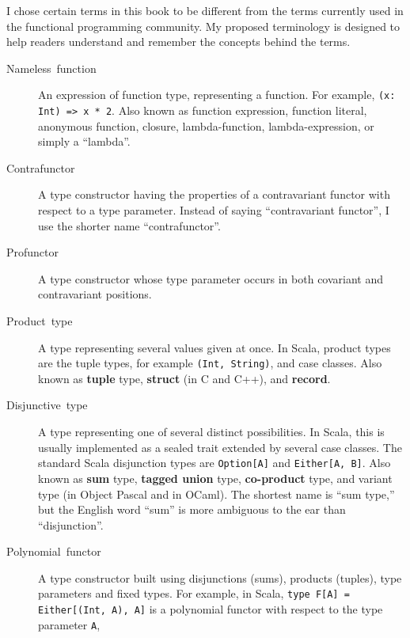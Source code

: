 I chose certain terms in this book to be different from the terms
currently used in the functional programming community. My proposed
terminology is designed to help readers understand and remember the
concepts behind the terms. 
\begin{description}
\item [{Nameless~function}] An expression of
function type, representing a function. For example, \lstinline!(x: Int) => x * 2!.
Also known as function expression, function literal, anonymous function,
closure, lambda-function, lambda-expression, or simply a ``lambda''.
\item [{Contrafunctor}] A type constructor having
the properties of a contravariant functor with respect to a type parameter.
Instead of saying ``contravariant functor'', I use the shorter name
``contrafunctor''.
\item [{Profunctor}] A type constructor whose type parameter
occurs in both covariant and contravariant positions.
\item [{Product~type}] A type representing several
values given at once. In Scala, product types are the tuple types,
for example \lstinline!(Int, String)!,
and case classes. Also known as \textbf{tuple}
type, \textbf{struct} (in C and C++), and \textbf{record}.
\item [{Disjunctive~type}] A type representing
one of several distinct possibilities. In Scala, this is usually implemented
as a sealed trait extended by several case classes. The standard Scala
disjunction types are \lstinline!Option[A]!
and \lstinline!Either[A, B]!.
Also known as \textbf{sum }type, \textbf{tagged union}
type, \textbf{co-product} type, and variant
type (in Object Pascal and in OCaml). The shortest name is ``sum
type,'' but the English word ``sum'' is more ambiguous to the ear
than ``disjunction''.
\item [{Polynomial~functor}] A type constructor
built using disjunctions (sums), products (tuples), type parameters
and fixed types. For example, in Scala, \lstinline!type F[A] = Either[(Int, A), A]!
is a polynomial functor with respect to the type parameter \lstinline!A!,

\end{description}
